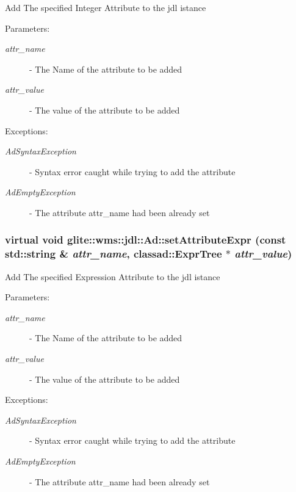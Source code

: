 Add The specified Integer Attribute to the jdl istance \begin{Desc}
\item[Parameters:]
\begin{description}
\item[{\em attr\_\-name}]- The Name of the attribute to be added \item[{\em attr\_\-value}]- The value of the attribute to be added \end{description}
\end{Desc}
\begin{Desc}
\item[Exceptions:]
\begin{description}
\item[{\em Ad\-Syntax\-Exception}]- Syntax error caught while trying to add the attribute \item[{\em Ad\-Empty\-Exception}]- The attribute attr\_\-name had been already set \end{description}
\end{Desc}
\hypertarget{classglite_1_1wms_1_1jdl_1_1Ad_z19_15}{
\subsubsection[setAttributeExpr]{\setlength{\rightskip}{0pt plus 5cm}virtual void glite::wms::jdl::Ad::set\-Attribute\-Expr (const std::string \& {\em attr\_\-name}, classad::Expr\-Tree $\ast$ {\em attr\_\-value})}}
\label{classglite_1_1wms_1_1jdl_1_1Ad_z19_15}


Add The specified Expression Attribute to the jdl istance \begin{Desc}
\item[Parameters:]
\begin{description}
\item[{\em attr\_\-name}]- The Name of the attribute to be added \item[{\em attr\_\-value}]- The value of the attribute to be added \end{description}
\end{Desc}
\begin{Desc}
\item[Exceptions:]
\begin{description}
\item[{\em Ad\-Syntax\-Exception}]- Syntax error caught while trying to add the attribute \item[{\em Ad\-Empty\-Exception}]- The attribute attr\_\-name had been already set \end{description}
\end{Desc}


